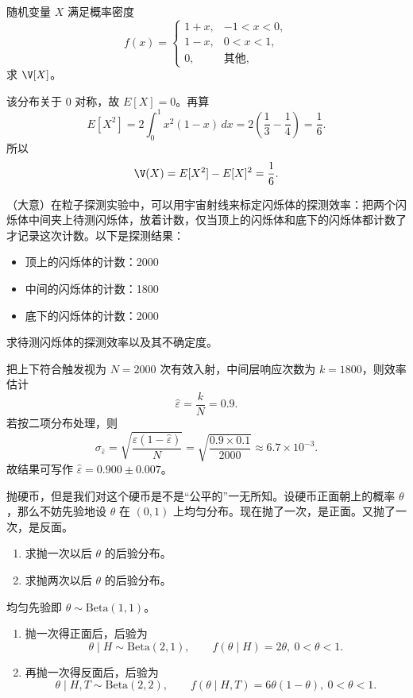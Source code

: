 \begin{question}
随机变量 $X$ 满足概率密度
\[
f(x)=\begin{cases}
1+x,&-1<x<0,\\
1-x,&0<x<1,\\
0,&\text{其他},
\end{cases}
\]
求 $\V[X]$。
\begin{solution}
该分布关于 $0$ 对称，故 $E[X]=0$。再算
\[
E[X^2]=2\int_0^1 x^2(1-x)\,dx
=2\left(\frac13-\frac14\right)=\frac16.
\]
所以
\[
\V(X)=E[X^2]-E[X]^2=\frac16.
\]
\end{solution}
\end{question}

\begin{question}
（大意）在粒子探测实验中，可以用宇宙射线来标定闪烁体的探测效率：把两个闪烁体中间夹上待测闪烁体，放着计数，仅当顶上的闪烁体和底下的闪烁体都计数了才记录这次计数。以下是探测结果：
\begin{itemize}[leftmargin=2em,itemsep=0.2em,topsep=0.2em]
\item 顶上的闪烁体的计数：2000
\item 中间的闪烁体的计数：1800
\item 底下的闪烁体的计数：2000
\end{itemize}
求待测闪烁体的探测效率以及其不确定度。
\begin{solution}
把上下符合触发视为 $N=2000$ 次有效入射，中间层响应次数为 $k=1800$，则效率估计
\[
\hat\varepsilon=\frac{k}{N}=0.9.
\]
若按二项分布处理，则
\[
\sigma_{\hat\varepsilon}=\sqrt{\frac{\hat\varepsilon(1-\hat\varepsilon)}{N}}
=\sqrt{\frac{0.9\times 0.1}{2000}}\approx 6.7\times 10^{-3}.
\]
故结果可写作 $\hat\varepsilon=0.900\pm 0.007$。
\end{solution}
\end{question}

\begin{question}
抛硬币，但是我们对这个硬币是不是“公平的”一无所知。设硬币正面朝上的概率 $\theta$，那么不妨先验地设 $\theta$ 在 $(0,1)$ 上均匀分布。现在抛了一次，是正面。又抛了一次，是反面。
\begin{enumerate}
\item 求抛一次以后 $\theta$ 的后验分布。
\item 求抛两次以后 $\theta$ 的后验分布。
\end{enumerate}
\begin{solution}
均匀先验即 $\theta\sim \mathrm{Beta}(1,1)$。
\begin{enumerate}
\item 抛一次得正面后，后验为
\[
\theta\mid H\sim \mathrm{Beta}(2,1),\qquad f(\theta\mid H)=2\theta,\ 0<\theta<1.
\]
\item 再抛一次得反面后，后验为
\[
\theta\mid H,T\sim \mathrm{Beta}(2,2),\qquad f(\theta\mid H,T)=6\theta(1-\theta),\ 0<\theta<1.
\]
\end{enumerate}
\end{solution}
\end{question}

